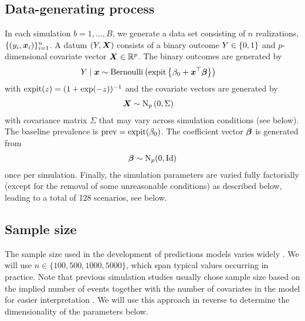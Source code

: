 \subsection{Data-generating process} \label{sec:dgp}

In each simulation $b = 1, \dots, B$, we generate a data set consisting of $n$
realizations, \ie $\{(y_i, \text{\boldmath$x$}_i)\}_{i=1}^n$. A datum $(Y, \text{\boldmath$X$})$ consists of
a binary outcome $Y \in \{0, 1\}$ and $p$-dimensional covariate vector
$\text{\boldmath$X$} \in \mathbb{R}^p$. The binary outcomes are generated by
\begin{align*}
  Y \mid \text{\boldmath$x$} &\sim \operatorname{Bernoulli}\left(\operatorname{expit}\left\{\beta_0 +
	\text{\boldmath$x$}^\top\text{\boldmath$\beta$}\right\}\right)
\end{align*}
with $\operatorname{expit}(z) = (1 + \exp(-z))^{-1}$ and the covariate vectors are generated by
\begin{align*}
  \text{\boldmath$X$} &\sim \operatorname{N}_p\left(0, \Sigma\right)
\end{align*}
with covariance matrix $\Sigma$ that may vary across simulation conditions (see below).
The baseline prevalence is $\operatorname{prev} = \operatorname{expit}(\beta_0)$. The coefficient vector
$\text{\boldmath$\beta$}$ is generated from
\begin{align*}
  \text{\boldmath$\beta$} \sim \operatorname{N}_p(0, \operatorname{Id})
\end{align*}
once per simulation. Finally, the simulation parameters are varied
fully factorially (except for the removal of some unreasonable conditions) as described below, leading to a total of 128
scenarios, see below.

\subsection*{Sample size}
The sample size used in the development of predictions models varies widely
\citep{Damen2016}. We will use $n \in \{100, 500, 1000, 5000\}$, which span typical values
occurring in practice. Note that previous simulation studies usually chose sample
size based on the implied number of events together with the number of covariates
in the model for easier interpretation \citep{vanSmeden2018, Riley2018}. We will use this approach in
reverse to determine the dimensionality of the parameters below.

